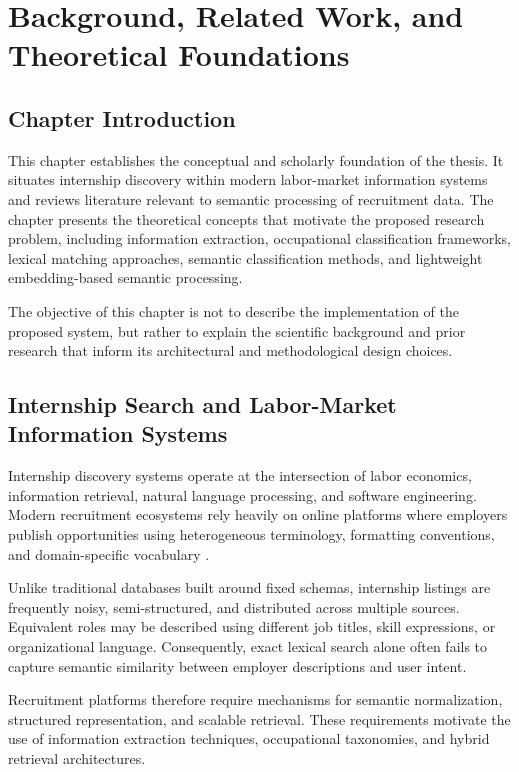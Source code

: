 \chapter{Background, Related Work, and Theoretical Foundations}

\label{chap:background}

\section{Chapter Introduction}

This chapter establishes the conceptual and scholarly foundation of the thesis. It situates internship discovery within modern labor-market information systems and reviews literature relevant to semantic processing of recruitment data. The chapter presents the theoretical concepts that motivate the proposed research problem, including information extraction, occupational classification frameworks, lexical matching approaches, semantic classification methods, and lightweight embedding-based semantic processing.

The objective of this chapter is not to describe the implementation of the proposed system, but rather to explain the scientific background and prior research that inform its architectural and methodological design choices.

\section{Internship Search and Labor-Market Information Systems}

Internship discovery systems operate at the intersection of labor economics, information retrieval, natural language processing, and software engineering. Modern recruitment ecosystems rely heavily on online platforms where employers publish opportunities using heterogeneous terminology, formatting conventions, and domain-specific vocabulary \cite{manning2008introduction}.

Unlike traditional databases built around fixed schemas, internship listings are frequently noisy, semi-structured, and distributed across multiple sources. Equivalent roles may be described using different job titles, skill expressions, or organizational language. Consequently, exact lexical search alone often fails to capture semantic similarity between employer descriptions and user intent.

Recruitment platforms therefore require mechanisms for semantic normalization, structured representation, and scalable retrieval. These requirements motivate the use of information extraction techniques, occupational taxonomies, and hybrid retrieval architectures.


